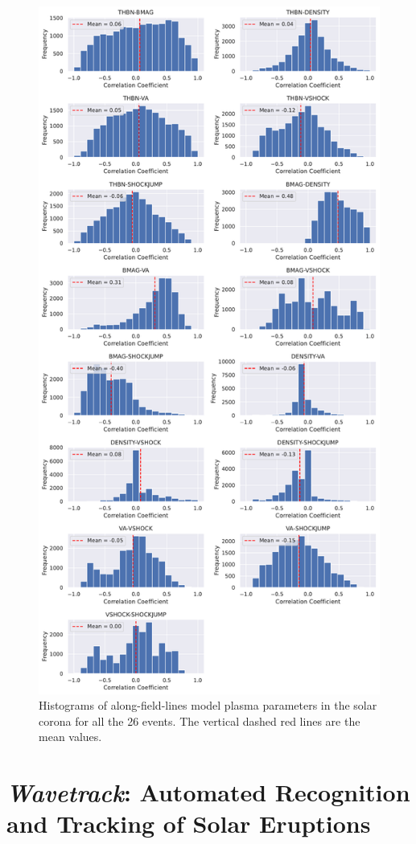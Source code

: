 \begin{figure}[!htp] %
	\centerline{\includegraphics[width=0.7\columnwidth]{chapter2/figs/wp3_d2_Fig16.pdf}}
	\caption{Histograms of along-field-lines model plasma parameters in the solar corona for all the 26 events. The vertical dashed red lines are the mean values.}
	\label{fig_hist_plasma_param_corr}
\end{figure}


\section{\textit{Wavetrack}: Automated Recognition and Tracking of Solar Eruptions}
